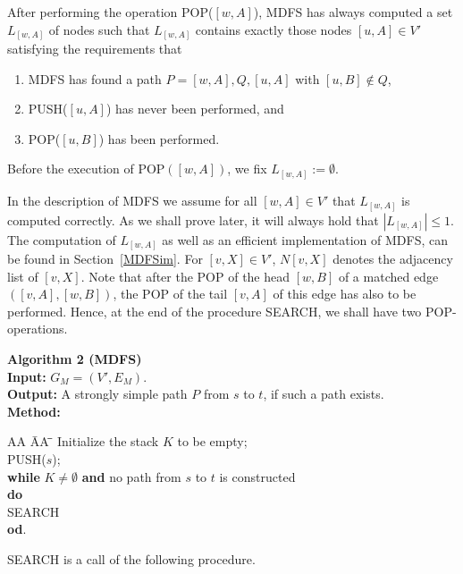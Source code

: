 \documentclass[12pt,twoside,a4paper]{article}
\begin{document}
\medskip
After performing the operation POP($[w,A]$), MDFS has always computed a
set $L_{[w,A]}$ of nodes such that $L_{[w,A]}$ contains exactly those
nodes $[u,A]\in V'$ satisfying the requirements that  \label{WM1}
\begin{enumerate}
\item MDFS has found a path $P = [w,A],Q,[u,A]$ with $[u,B] \not\in Q$,
\item PUSH($[u,A]$) has never been performed, and
\item POP($[u,B]$) has been performed.
\end{enumerate}
Before the execution of POP$([w,A])$, we fix $L_{[w,A]} := \emptyset$. 

\medskip
In the description of MDFS we assume for all $[w,A]\in V'$ that
$L_{[w,A]}$ is computed correctly. As we shall prove later, it will always hold
that $|L_{[w,A]}| \leq 1$.
The computation of $L_{[w,A]}$ as well
as an efficient implementation of MDFS, can be found in Section~\ref{MDFSim}.
For $[v,X] \in V'$, $N[v,X]$ denotes the adjacency list of $[v,X]$.
Note that after the POP of the head $[w,B]$ of a matched edge $([v,A],[w,B])$,
the POP of the tail $[v,A]$ of this edge has also to be performed. Hence, at the
end of the procedure SEARCH, we shall have two POP-operations.

\medskip
\noindent
{\bf Algorithm 2 (MDFS)} \\
{\bf Input:} $G_M=(V',E_M)$. \\
{\bf Output:} A strongly simple path $P$ from $s$ to $t$, if such a path exists.\\
{\bf Method:}
\vspace{-0.3cm}
\begin{tabbing}
AA \= AA \= \= \kill
Initialize the stack $K$ to be empty; \\
PUSH($s$); \\
{\bf while} $K\not=\emptyset$ {\bf and} no path from $s$ to $t$ is constructed \\
\> {\bf do} \\
\> \> SEARCH \\
\> {\bf od}.
\end{tabbing}
\noindent
SEARCH is a call of the following procedure. 
\end{document}
